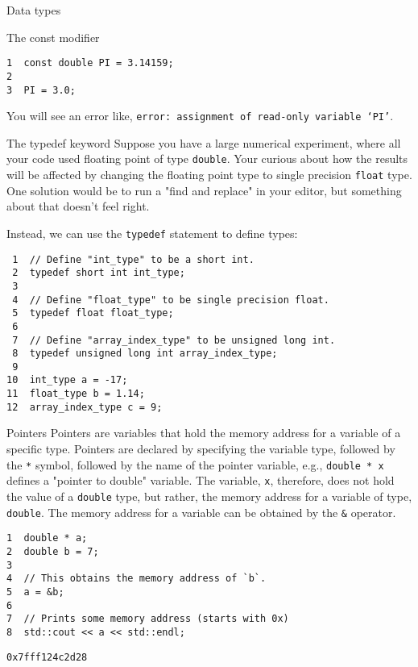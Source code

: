 \documentclass[presentation]{beamer}
\begin{document}
\begin{frame}[fragile,label={sec:orgheadline3}]{Data types}
\begin{block}{The const modifier}
\begin{verbatim}
1  const double PI = 3.14159;
2  
3  PI = 3.0;
\end{verbatim}

You will see an error like, \texttt{error: assignment of read-only variable ‘PI’}. 
\end{block}

\begin{block}{The typedef keyword}
Suppose you have a large numerical experiment, where all your code used 
floating point of type \texttt{double}. Your curious about how the results will 
be affected by changing the floating point type to single precision \texttt{float}
type. One solution would be to run a "find and replace" in your editor, but 
something about that doesn't feel right.

Instead, we can use the \texttt{typedef} statement to define types:

\begin{verbatim}
 1  // Define "int_type" to be a short int.
 2  typedef short int int_type;
 3  
 4  // Define "float_type" to be single precision float.
 5  typedef float float_type;
 6  
 7  // Define "array_index_type" to be unsigned long int.
 8  typedef unsigned long int array_index_type;
 9  
10  int_type a = -17; 
11  float_type b = 1.14; 
12  array_index_type c = 9;
\end{verbatim}
\end{block}

\begin{block}{Pointers}
Pointers are variables that hold the \alert{memory address} for a variable 
of a specific type. Pointers are declared by specifying the variable 
type, followed by the \texttt{*} symbol, followed by the name of the pointer 
variable, e.g., \texttt{double * x} defines a "pointer to double" variable. 
The variable, \texttt{x}, therefore, does not hold the value of a \texttt{double} 
type, but rather, the memory address for a variable of type, \texttt{double}.
The memory address for a variable can be obtained by the \texttt{\&} operator.

\begin{verbatim}
1  double * a;
2  double b = 7;
3  
4  // This obtains the memory address of `b`.
5  a = &b;
6  
7  // Prints some memory address (starts with 0x)
8  std::cout << a << std::endl;
\end{verbatim}

\begin{verbatim}
0x7fff124c2d28
\end{verbatim}


\end{block}
\end{frame}
\end{document}
